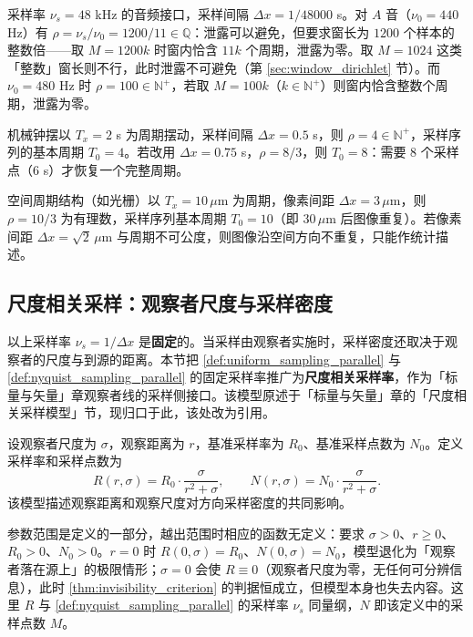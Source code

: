 \begin{example}[数字信号]\label{ex:digital_signal_modelling}
采样率 $\nu_s=48$ kHz 的音频接口，采样间隔 $\Delta x=1/48000$ s。对 $A$ 音（$\nu_0=440$ Hz）有 $\rho=\nu_s/\nu_0=1200/11\in\mathbb{Q}$：泄露可以避免，但要求窗长为 $1200$ 个样本的整数倍——取 $M=1200k$ 时窗内恰含 $11k$ 个周期，泄露为零。取 $M=1024$ 这类「整数」窗长则不行，此时泄露不可避免（第 \ref{sec:window_dirichlet} 节）。而 $\nu_0=480$ Hz 时 $\rho=100\in\mathbb{N}^+$，若取 $M=100k$（$k\in\mathbb{N}^+$）则窗内恰含整数个周期，泄露为零。
\end{example}

\begin{example}[离散时钟]\label{ex:discrete_clock_modelling}
机械钟摆以 $T_x=2$ s 为周期摆动，采样间隔 $\Delta x=0.5$ s，则 $\rho=4\in\mathbb{N}^+$，采样序列的基本周期 $T_0=4$。若改用 $\Delta x=0.75$ s，$\rho=8/3$，则 $T_0=8$：需要 $8$ 个采样点（$6$ s）才恢复一个完整周期。
\end{example}

\begin{example}[传感器网格采样]\label{ex:sensor_modelling}
空间周期结构（如光栅）以 $T_x=10\,\mu$m 为周期，像素间距 $\Delta x=3\,\mu$m，则 $\rho=10/3$ 为有理数，采样序列基本周期 $T_0=10$（即 $30\,\mu$m 后图像重复）。若像素间距 $\Delta x=\sqrt{2}\,\mu$m 与周期不可公度，则图像沿空间方向不重复，只能作统计描述。
\end{example}

\subsection{尺度相关采样：观察者尺度与采样密度}\label{sec:dynamic_sampling}

以上采样率 $\nu_s=1/\Delta x$ 是\textbf{固定}的。当采样由观察者实施时，采样密度还取决于观察者的尺度与到源的距离。本节把 \cref{def:uniform_sampling_parallel} 与 \cref{def:nyquist_sampling_parallel} 的固定采样率推广为\textbf{尺度相关采样率}，作为「标量与矢量」章观察者线的采样侧接口。该模型原述于「标量与矢量」章的「尺度相关采样模型」节，现归口于此，该处改为引用。

\begin{definition}[尺度相关采样函数]\label{def:dynamic_sampling}
设观察者尺度为 $\sigma$，观察距离为 $r$，基准采样率为 $R_0$、基准采样点数为 $N_0$。定义采样率和采样点数为
\[
R(r, \sigma) = R_0 \cdot \frac{\sigma}{r^2 + \sigma}, \qquad
N(r, \sigma) = N_0 \cdot \frac{\sigma}{r^2 + \sigma}.
\]
该模型描述观察距离和观察尺度对方向采样密度的共同影响。

参数范围是定义的一部分，越出范围时相应的函数无定义：要求 $\sigma>0$、$r\ge0$、$R_0>0$、$N_0>0$。$r=0$ 时 $R(0,\sigma)=R_0$、$N(0,\sigma)=N_0$，模型退化为「观察者落在源上」的极限情形；$\sigma=0$ 会使 $R\equiv0$（观察者尺度为零，无任何可分辨信息），此时 \cref{thm:invisibility_criterion} 的判据恒成立，但模型本身也失去内容。这里 $R$ 与 \cref{def:nyquist_sampling_parallel} 的采样率 $\nu_s$ 同量纲，$N$ 即该定义中的采样点数 $M$。
\end{definition}

